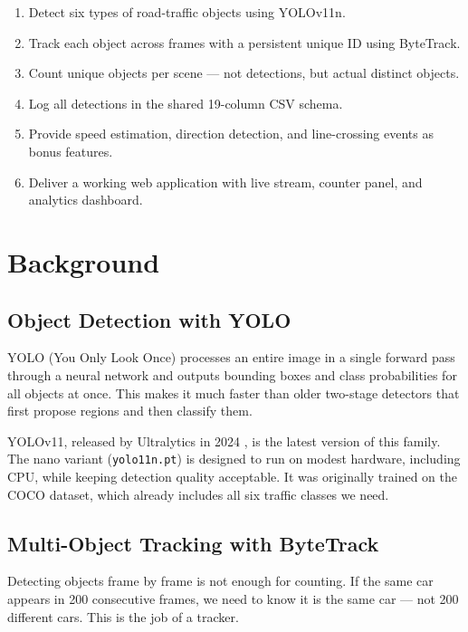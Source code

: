 \documentclass[12pt,a4paper,leqno]{report}
\begin{document}
\begin{enumerate}[label=\arabic*.]
  \item Detect six types of road-traffic objects using YOLOv11n.
  \item Track each object across frames with a persistent unique ID using ByteTrack.
  \item Count unique objects per scene — not detections, but actual distinct objects.
  \item Log all detections in the shared 19-column CSV schema.
  \item Provide speed estimation, direction detection, and line-crossing events as bonus features.
  \item Deliver a working web application with live stream, counter panel, and analytics dashboard.
\end{enumerate}

\chapter{Background}

\section{Object Detection with YOLO}

YOLO (You Only Look Once) \cite{redmon2016yolo} processes an entire image in a single forward pass through a neural network and outputs bounding boxes and class probabilities for all objects at once. This makes it much faster than older two-stage detectors that first propose regions and then classify them.

YOLOv11, released by Ultralytics in 2024 \cite{ultralytics2024}, is the latest version of this family. The nano variant (\texttt{yolo11n.pt}) is designed to run on modest hardware, including CPU, while keeping detection quality acceptable. It was originally trained on the COCO dataset, which already includes all six traffic classes we need.

\section{Multi-Object Tracking with ByteTrack}

Detecting objects frame by frame is not enough for counting. If the same car appears in 200 consecutive frames, we need to know it is the same car — not 200 different cars. This is the job of a tracker.
\end{document}
